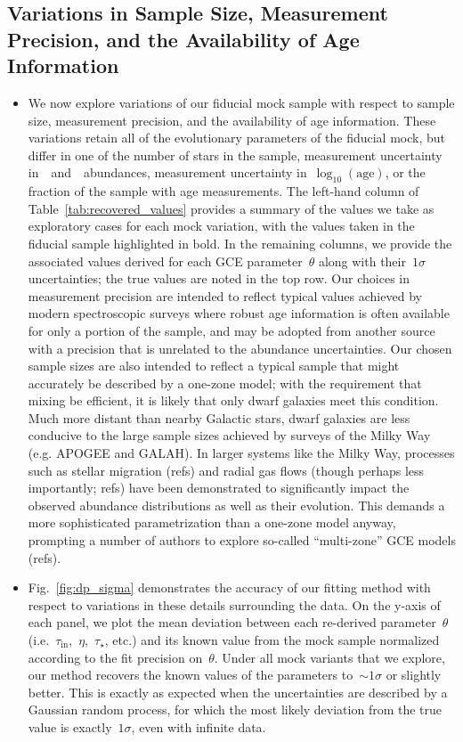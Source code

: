 \documentclass[ms.tex]{subfiles}
\begin{document}
\subsection{Variations in Sample Size, Measurement Precision, and the
Availability of Age Information}
\label{sec:mocks:variations}

\begin{itemize}

	\item We now explore variations of our fiducial mock sample with respect
	to sample size, measurement precision, and the availability of age
	information.
	These variations retain all of the evolutionary parameters of the fiducial
	mock, but differ in one of the number of stars in the sample, measurement
	uncertainty in~\feh~and~\afe~abundances, measurement uncertainty
	in~$\log_{10}(\text{age})$, or the fraction of the sample with age
	measurements.
	The left-hand column of Table~\ref{tab:recovered_values} provides a summary
	of the values we take as exploratory cases for each mock variation, with
	the values taken in the fiducial sample highlighted in bold.
	In the remaining columns, we provide the associated values derived for each
	GCE parameter~$\theta$ along with their~$1\sigma$ uncertainties; the true
	values are noted in the top row.
	Our choices in measurement precision are intended to reflect typical values
	achieved by modern spectroscopic surveys where robust age information is
	often available for only a portion of the sample, and may be adopted from
	another source with a precision that is unrelated to the abundance
	uncertainties.
	Our chosen sample sizes are also intended to reflect a typical sample that
	might accurately be described by a one-zone model; with the requirement
	that mixing be efficient, it is likely that only dwarf galaxies meet this
	condition.
	Much more distant than nearby Galactic stars, dwarf galaxies are less
	conducive to the large sample sizes achieved by surveys of the Milky Way
	(e.g. APOGEE and GALAH).
	In larger systems like the Milky Way, processes such as stellar migration
	(refs) and radial gas flows (though perhaps less importantly; refs) have
	been demonstrated to significantly impact the observed abundance
	distributions as well as their evolution.
	This demands a more sophisticated parametrization than a one-zone model
	anyway, prompting a number of authors to explore so-called ``multi-zone''
	GCE models (refs).

	\item Fig.~\ref{fig:dp_sigma} demonstrates the accuracy of our fitting
	method with respect to variations in these details surrounding the data.
	On the y-axis of each panel, we plot the mean deviation between each
	re-derived parameter~$\theta$ (i.e.~$\tau_\text{in}$,~$\eta$,~$\tau_\star$,
	etc.) and its known value from the mock sample normalized according to the
	fit precision on~$\theta$.
	Under all mock variants that we explore, our method recovers the known
	values of the parameters to~$\sim1\sigma$ or slightly better.
	This is exactly as expected when the uncertainties are described by a
	Gaussian random process, for which the most likely deviation from the true
	value is exactly~$1\sigma$, even with infinite data.


\end{itemize}
\end{document}
